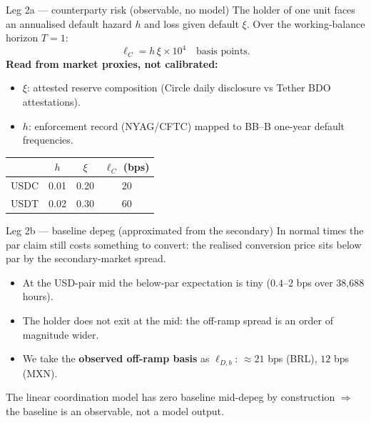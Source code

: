 \documentclass[11pt,aspectratio=169]{beamer}
\begin{document}
\begin{frame}{Leg 2a --- counterparty risk (observable, no model)}
The holder of one unit faces an annualised default hazard \(h\) and loss given
default \(\xi\). Over the working-balance horizon \(T=1\):
\[
  \ell_C = h\,\xi \times 10^4 \quad\text{basis points.}
\]
\textbf{Read from market proxies, not calibrated:}
\begin{itemize}
  \item \(\xi\): attested reserve composition (Circle daily disclosure vs Tether BDO attestations).
  \item \(h\): enforcement record (NYAG/CFTC) mapped to BB--B one-year default frequencies.
\end{itemize}
\vspace{0.5em}
\begin{center}
\begin{tabular}{lccc}
\toprule
 & \(h\) & \(\xi\) & \(\ell_C\) (bps) \\
\midrule
USDC & 0.01 & 0.20 & 20 \\
USDT & 0.02 & 0.30 & 60 \\
\bottomrule
\end{tabular}
\end{center}
\end{frame}

\begin{frame}{Leg 2b --- baseline depeg (approximated from the secondary)}
In normal times the par claim still costs something to convert: the realised
conversion price sits below par by the secondary-market spread.
\begin{itemize}
  \item At the USD-pair mid the below-par expectation is tiny (\(0.4\)--\(2\) bps over 38{,}688 hours).
  \item The holder does not exit at the mid: the off-ramp spread is an order of magnitude wider.
  \item We take the \textbf{observed off-ramp basis} as \(\ell_{D,b}\): \(\approx 21\) bps (BRL), \(12\) bps (MXN).
\end{itemize}
\vspace{0.5em}
\centering
\textcolor{game}{The linear coordination model has zero baseline mid-depeg by
construction \(\Rightarrow\) the baseline is an observable, not a model output.}
\end{frame}
\end{document}
